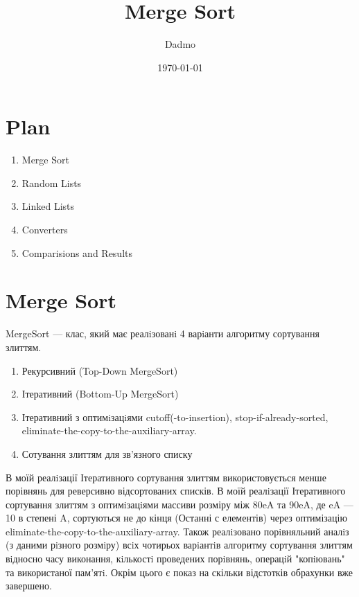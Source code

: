 \documentclass{article}
\title{Merge Sort}
\author{Dadmo}
\date{\today}
\begin{document}
\maketitle

\section{Plan}
\begin{enumerate}
    \item Merge Sort
    \item Random Lists
    \item Linked Lists
    \item Converters
    \item Comparisions and Results
\end{enumerate}
    \section{Merge Sort}
    MergeSort --- клас, який має реалiзованi 4 варiанти алгоритму сортування злиттям. 
    \begin{enumerate}
        \item Рекурсивний (Top-Down MergeSort)
        \item Ітеративний (Bottom-Up MergeSort)
        \item Ітеративний з оптимiзацiями cutoff(-to-insertion), stop-if-already-sorted, eliminate-the-copy-to-the-auxiliary-array.
        \item Сотування злиттям для зв’язного списку
    \end{enumerate}
    \indent В моїй реалiзації Ітеративного сортування злиттям використовується менше порівнянь для реверсивно відсортованих списків.
    \newline
    \indent В моїй реалiзації Ітеративного сортування злиттям з оптимiзацiями массиви розміру між 80eA та 90eA, де eA --- 10 в степені A, сортуються не до кінця (Останні с елементів) через оптимізацію eliminate-the-copy-to-the-auxiliary-array.
    \newline
    \indent Також реалiзовано порiвняльний аналiз (з даними рiзного розмiру) всiх чотирьох варiантiв
    алгоритму сортування злиттям вiдносно часу виконання, кiлькостi проведених
    порiвнянь, операцiй "копiювань" та використаної пам’ятi. Окрім цього є показ на скільки відстотків обрахунки вже завершено.
    \newline
\end{document}
